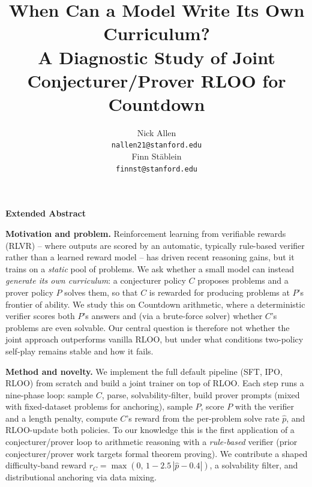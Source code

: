 \documentclass{article}
\title{When Can a Model Write Its Own Curriculum?\\
A Diagnostic Study of Joint Conjecturer/Prover RLOO for Countdown}
\author{%
  Nick Allen \\ \texttt{nallen21@stanford.edu} \\
  \And
  Finn St\"ablein \\ \texttt{finnst@stanford.edu} \\
}
\begin{document}
\maketitle

\begin{center}\textbf{\large Extended Abstract}\end{center}

\noindent\textbf{Motivation and problem.}
Reinforcement learning from verifiable rewards (RLVR) -- where outputs are scored
by an automatic, typically rule-based verifier rather than a learned reward
model -- has driven recent reasoning gains, but it trains on a \emph{static} pool
of problems. We ask
whether a small model can instead \emph{generate its own curriculum}: a
conjecturer policy $C$ proposes problems and a prover policy $P$ solves them, so
that $C$ is rewarded for producing problems at $P$'s frontier of ability. We
study this on Countdown arithmetic, where a deterministic verifier scores both
$P$'s answers and (via a brute-force solver) whether $C$'s problems are even
solvable. Our central question is therefore not whether the joint approach outperforms
vanilla RLOO, but under what conditions two-policy self-play remains stable and
how it fails.

\noindent\textbf{Method and novelty.}
We implement the full default pipeline (SFT, IPO, RLOO) from scratch and build a
joint trainer on top of RLOO. Each step runs a nine-phase loop: sample $C$,
parse, solvability-filter, build prover prompts (mixed with fixed-dataset
problems for anchoring), sample $P$, score $P$ with the verifier and a length
penalty, compute $C$'s reward from the per-problem solve rate $\hat{p}$, and
RLOO-update both policies. To our knowledge this is the first application of a
conjecturer/prover loop to arithmetic reasoning with a \emph{rule-based} verifier
(prior conjecturer/prover work targets formal theorem proving). We contribute a
shaped difficulty-band reward $r_C=\max(0,\,1-2.5\,|\hat{p}-0.4|)$, a
solvability filter, and distributional anchoring via data mixing.
\end{document}
